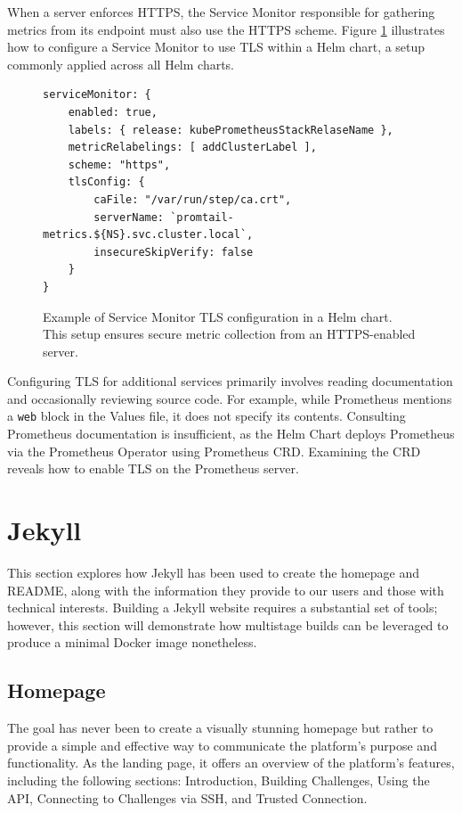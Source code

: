 When a server enforces HTTPS, the Service Monitor responsible for gathering metrics from its endpoint must also use the HTTPS scheme. Figure \ref{fig:service_monitor_tls} illustrates how to configure a Service Monitor to use TLS within a Helm chart, a setup commonly applied across all Helm charts.

\begin{figure}[h]
    \centering
\begin{verbatim}
serviceMonitor: {
    enabled: true,
    labels: { release: kubePrometheusStackRelaseName },
    metricRelabelings: [ addClusterLabel ],
    scheme: "https",
    tlsConfig: {
        caFile: "/var/run/step/ca.crt",
        serverName: `promtail-metrics.${NS}.svc.cluster.local`,
        insecureSkipVerify: false
    }
}
\end{verbatim}
\caption{Example of Service Monitor TLS configuration in a Helm chart. This setup ensures secure metric collection from an HTTPS-enabled server.}
    \label{fig:service_monitor_tls}
\end{figure}

Configuring TLS for additional services primarily involves reading documentation and occasionally reviewing source code. For example, while Prometheus mentions a \texttt{web} block in the Values file, it does not specify its contents. Consulting Prometheus documentation is insufficient, as the Helm Chart deploys Prometheus via the Prometheus Operator using Prometheus CRD. Examining the CRD reveals how to enable TLS on the Prometheus server.

\section{Jekyll}
This section explores how Jekyll has been used to create the homepage and README, along with the information they provide to our users and those with technical interests. Building a Jekyll website requires a substantial set of tools; however, this section will demonstrate how multistage builds can be leveraged to produce a minimal Docker image nonetheless.

\subsection{Homepage}
The goal has never been to create a visually stunning homepage but rather to provide a simple and effective way to communicate the platform's purpose and functionality. As the landing page, it offers an overview of the platform's features, including the following sections: Introduction, Building Challenges, Using the API, Connecting to Challenges via SSH, and Trusted Connection.

